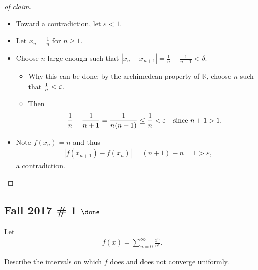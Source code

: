 \begin{solution}
\begin{proof}[of claim]
\envlist

\begin{itemize}
\tightlist
\item
  Toward a contradiction, let \(\varepsilon < 1\).
\item
  Let \(x_n = \frac 1 n\) for \(n\geq 1\).
\item
  Choose \(n\) large enough such that
  \({\left\lvert {x_n - x_{n+1}} \right\rvert} = \frac 1 n - \frac 1 {n+1} < \delta\).

  \begin{itemize}
  \tightlist
  \item
    Why this can be done: by the archimedean property of
    \({\mathbb{R}}\), choose \(n\) such that
    \({1\over n} < \varepsilon\).
  \item
    Then
    \begin{align*}
    {1 \over n} - {1\over n+1} = {1 \over n(n+1)} \leq {1\over n} < \varepsilon\quad\text{since }n+1 > 1
    .\end{align*}
  \end{itemize}
\item
  Note \(f(x_n) = n\) and thus
  \begin{align*}
  {\left\lvert {f(x_{n+1}) - f(x_{n})} \right\rvert} = (n+1) - n = 1 > \varepsilon
  ,\end{align*}
  a contradiction.
\end{itemize}

\end{proof}

\end{solution}

\hypertarget{fall-2017-1-done}{%
\subsection{\texorpdfstring{Fall 2017 \# 1
\(\done\)}{Fall 2017 \# 1 \textbackslash done}}\label{fall-2017-1-done}}

Let
\begin{align*}
f(x) = \sum _{n=0}^{\infty} \frac{x^{n}}{n !}.
\end{align*}

Describe the intervals on which \(f\) does and does not converge
uniformly.

